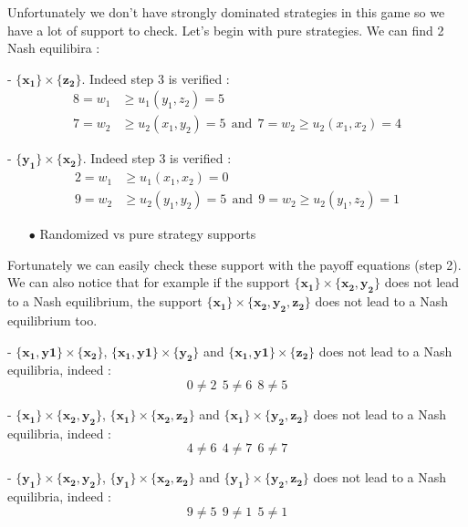 Unfortunately we don't have strongly dominated strategies in this game so we have a lot of support to check. Let's begin with pure strategies. We can find 2 Nash equilibira :

- $\mathbf{\{x_1\}}\times\mathbf{\{z_2\}}$. Indeed step 3 is verified :
\begin{align*}
    8 =w_1&\ge u_1(y_1,z_2)=5   \\
    7=w_2&\ge u_2(x_1,y_2)=5 \ \ \mbox{and} \ \ 7=w_2\ge u_2(x_1,x_2)=4 
\end{align*}


- $\mathbf{\{y_1\}}\times\mathbf{\{x_2\}}$. Indeed step 3 is verified :
\begin{align*}
    2 =w_1&\ge u_1(x_1,x_2)=0 \\
    9=w_2&\ge u_2(y_1,y_2)=5  \ \ \mbox{and} \ \  9=w_2\ge u_2(y_1,z_2)=1
\end{align*}

\begin{itemize}
  \item[$\bullet$] Randomized vs pure strategy supports
\end{itemize}

Fortunately we can easily check these support with the payoff equations (step 2). We can also notice that for example if the support $\mathbf{\{x_1\}}\times\mathbf{\{x_2,y_2\}}$  does not lead to a Nash equilibrium, the support $\mathbf{\{x_1\}}\times\mathbf{\{x_2,y_2,z_2\}}$ does not lead to a Nash equilibrium too. 

- $\mathbf{\{x_1,y1\}}\times\mathbf{\{x_2\}}$, $\mathbf{\{x_1,y1\}}\times\mathbf{\{y_2\}}$ and $\mathbf{\{x_1,y1\}}\times\mathbf{\{z_2\}}$ does not lead to a Nash equilibria, indeed :
\begin{equation*}
    0\ne2 \ \ 5\ne6 \ \ 8\ne5
\end{equation*}

- $\mathbf{\{x_1\}}\times\mathbf{\{x_2,y_2\}}$, $\mathbf{\{x_1\}}\times\mathbf{\{x_2,z_2\}}$ and $\mathbf{\{x_1\}}\times\mathbf{\{y_2,z_2\}}$ does not lead to a Nash equilibria, indeed :
\begin{equation*}
    4\ne6 \ \ 4\ne7 \ \ 6\ne7
\end{equation*}

- $\mathbf{\{y_1\}}\times\mathbf{\{x_2,y_2\}}$, $\mathbf{\{y_1\}}\times\mathbf{\{x_2,z_2\}}$ and $\mathbf{\{y_1\}}\times\mathbf{\{y_2,z_2\}}$ does not lead to a Nash equilibria, indeed :
\begin{equation*}
    9\ne5 \ \ 9\ne1 \ \ 5\ne1
\end{equation*}


